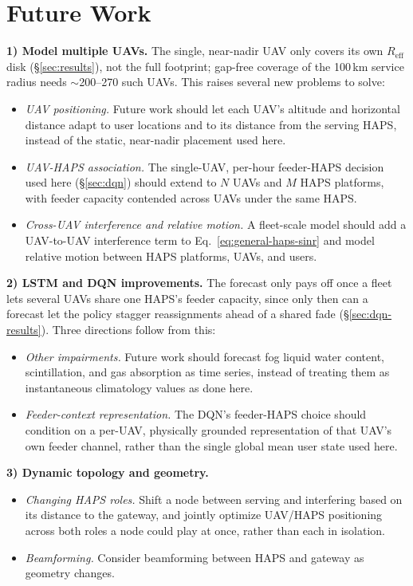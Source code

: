 \documentclass[]{ieeeaccess}
\begin{document}
\section{Future Work}
\label{sec:roadmap}

\textbf{1) Model multiple UAVs.} The single, near-nadir UAV only covers its own $R_\mathrm{eff}$ disk (\S\ref{sec:results}), not the full footprint; gap-free coverage of the 100\,km service radius needs $\sim$200--270 such UAVs. This raises several new problems to solve:
\begin{itemize}\setlength{\itemsep}{1pt}
  \item \emph{UAV positioning.} Future work should let each UAV's altitude and horizontal distance adapt to user locations and to its distance from the serving HAPS, instead of the static, near-nadir placement used here.
  \item \emph{UAV-HAPS association.} The single-UAV, per-hour feeder-HAPS decision used here (\S\ref{sec:dqn}) should extend to $N$ UAVs and $M$ HAPS platforms, with feeder capacity contended across UAVs under the same HAPS.
  \item \emph{Cross-UAV interference and relative motion.} A fleet-scale model should add a UAV-to-UAV interference term to Eq.~\eqref{eq:general-haps-sinr} and model relative motion between HAPS platforms, UAVs, and users.
\end{itemize}

\textbf{2) LSTM and DQN improvements.} The forecast only pays off once a fleet lets several UAVs share one HAPS's feeder capacity, since only then can a forecast let the policy stagger reassignments ahead of a shared fade (\S\ref{sec:dqn-results}). Three directions follow from this:
\begin{itemize}\setlength{\itemsep}{1pt}
  \item \emph{Other impairments.} Future work should forecast fog liquid water content, scintillation, and gas absorption as time series, instead of treating them as instantaneous climatology values as done here.
  \item \emph{Feeder-context representation.} The DQN's feeder-HAPS choice should condition on a per-UAV, physically grounded representation of that UAV's own feeder channel, rather than the single global mean user state used here.
\end{itemize}

\textbf{3) Dynamic topology and geometry.}
\begin{itemize}\setlength{\itemsep}{1pt}
  \item \emph{Changing HAPS roles.} Shift a node between serving and interfering based on its distance to the gateway, and jointly optimize UAV/HAPS positioning across both roles a node could play at once, rather than each in isolation.
  \item \emph{Beamforming.} Consider beamforming between HAPS and gateway as geometry changes.
\end{itemize}
\end{document}
